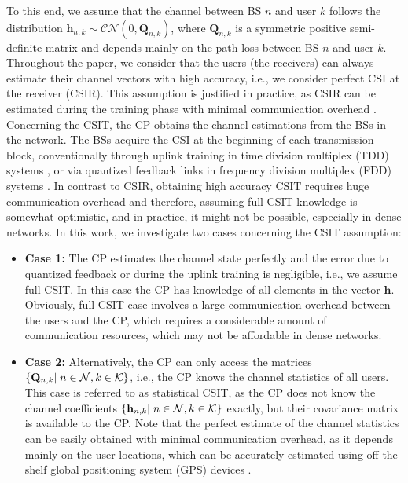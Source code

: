 \documentclass[12pt,draftcls,onecolumn]{IEEEtran}
\theoremstyle{remark}
\theoremstyle{definition}
\begin{document}
To this end, we assume that the channel between BS $n$ and user $k$ follows the distribution $\mathbf{h}_{n, k} \sim \mathbf{\mathcal{CN}}\left(0, \mathbf{Q}_{n, k}\right)$, where $\mathbf{Q}_{n, k}$ is a symmetric positive semi-definite matrix and depends mainly on the path-loss between BS $n$ and user $k$. 
Throughout the paper, we consider that the users (the receivers) can always estimate their channel vectors with high accuracy, i.e., we consider perfect CSI at the receiver (CSIR). This assumption is justified in practice, as CSIR can be estimated during the training phase with minimal communication overhead \cite{4383372, 10.5555/1111206}. Concerning the CSIT, the CP obtains the channel estimations from the BSs in the network. The BSs acquire the CSI at the beginning of each transmission block, conventionally through uplink training in time division multiplex (TDD) systems \cite{1193803}, or via quantized feedback links in frequency division multiplex (FDD) systems \cite{4641946}. In contrast to CSIR, obtaining high accuracy CSIT requires huge communication overhead and therefore, assuming full CSIT knowledge is somewhat optimistic, and in practice, it might not be possible, especially in dense networks. In this work, we investigate two cases concerning the CSIT assumption:
\begin{itemize} 
	\item{\textbf{{Case 1:}} The CP estimates the channel state perfectly and the error due to quantized feedback or during the uplink training is negligible, i.e., we assume full CSIT. In this case the CP has knowledge of all elements in the vector $\mathbf{h}$}. Obviously, full CSIT case involves a large communication overhead between the users and the CP, which requires a considerable amount of communication resources, which may not be affordable in dense networks.
	\item{\textbf{{Case 2:}} Alternatively, the CP can only access the matrices $\left\lbrace  \mathbf{Q}_{n,k}|\hspace{1mm} n\in \mathcal{N}, k \in \mathcal{K}\right\rbrace $}, i.e., the CP knows the channel statistics of all users. This case is referred to as statistical CSIT, as the CP does not know the channel coefficients $\left\lbrace \mathbf{h}_{n,k}|\hspace{1mm} n \in \mathcal{N}, k \in \mathcal{K} \right\rbrace$ exactly, but their covariance matrix is available to the CP. Note that the perfect estimate of the channel statistics can be easily obtained with minimal communication overhead, as it depends mainly on the user locations, which can be accurately estimated using off-the-shelf global positioning system (GPS) devices \cite{8664604}.      
\end{itemize} 
\end{document}
